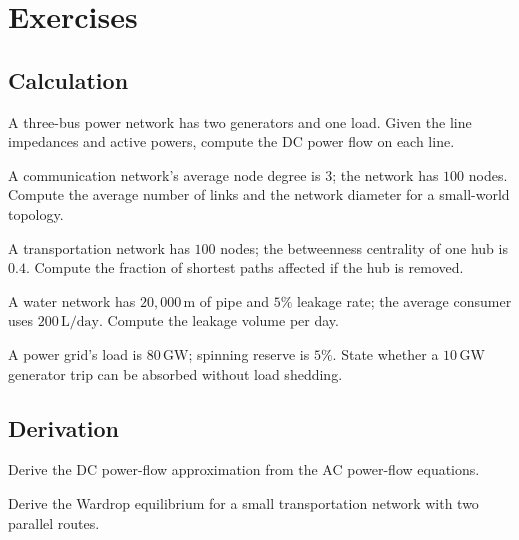 \section{Exercises}

\subsection*{Calculation}

\begin{exercise}
A three-bus power network has two generators and one load. Given the line impedances and active powers, compute the DC power flow on each line.
\end{exercise}

\begin{exercise}
A communication network's average node degree is $3$; the network has $100$ nodes. Compute the average number of links and the network diameter for a small-world topology.
\end{exercise}

\begin{exercise}
A transportation network has $100$ nodes; the betweenness centrality of one hub is $0.4$. Compute the fraction of shortest paths affected if the hub is removed.
\end{exercise}

\begin{exercise}
A water network has $20{,}000\,\text{m}$ of pipe and $5\%$ leakage rate; the average consumer uses $200\,\text{L/day}$. Compute the leakage volume per day.
\end{exercise}

\begin{exercise}
A power grid's load is $80\,\text{GW}$; spinning reserve is $5\%$. State whether a $10\,\text{GW}$ generator trip can be absorbed without load shedding.
\end{exercise}

\subsection*{Derivation}

\begin{exercise}
Derive the DC power-flow approximation from the AC power-flow equations.
\end{exercise}

\begin{exercise}
Derive the Wardrop equilibrium for a small transportation network with two parallel routes.
\end{exercise}

